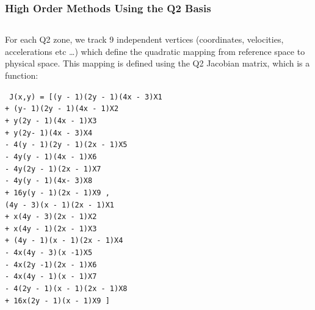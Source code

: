 \documentclass[8pt,xcolor=svgnames]{beamer}
\begin{document}
\begin{frame}
 \frametitle{High Order Methods Using the Q2 Basis}
 \begin{columns}
  \begin{column}{0.35\textwidth}
{\footnotesize
   For each Q2 zone, we track 9 independent vertices (coordinates, velocities, accelerations etc …) which define the quadratic mapping from reference space to physical space. This mapping is defined using the Q2 Jacobian matrix, which is a function: }
   
\bigskip
\tiny{\texttt{
J(x,y) =  [(y - 1)(2y - 1)(4x - 3)X1 \\
\hspace*{10ex}     + (y- 1)(2y - 1)(4x - 1)X2 \\
\hspace*{10ex}     + y(2y - 1)(4x - 1)X3  \\
\hspace*{10ex}     + y(2y- 1)(4x - 3)X4 \\
\hspace*{10ex}     - 4(y - 1)(2y - 1)(2x - 1)X5 \\ 
\hspace*{10ex}     - 4y(y - 1)(4x - 1)X6 \\
\hspace*{10ex}     - 4y(2y - 1)(2x - 1)X7  \\
\hspace*{10ex}     - 4y(y - 1)(4x- 3)X8 \\
\hspace*{10ex}     + 16y(y - 1)(2x - 1)X9 , \\
%
\hspace*{10ex}       (4y - 3)(x - 1)(2x - 1)X1\\  
\hspace*{10ex}     + x(4y - 3)(2x - 1)X2 \\
\hspace*{10ex}     + x(4y - 1)(2x - 1)X3  \\
\hspace*{10ex}     + (4y - 1)(x - 1)(2x - 1)X4 \\
\hspace*{10ex}     - 4x(4y - 3)(x -1)X5  \\
\hspace*{10ex}     - 4x(2y -1)(2x - 1)X6 \\
\hspace*{10ex}     - 4x(4y - 1)(x - 1)X7  \\
\hspace*{10ex}     - 4(2y - 1)(x - 1)(2x - 1)X8 \\
\hspace*{10ex}     + 16x(2y - 1)(x - 1)X9 ]
}}
\vspace*{-4ex}
   

\end{column}
\end{columns}
\end{frame}
\end{document}
